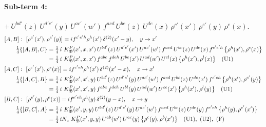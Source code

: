 \documentclass[10pt]{article}
\numberwithin{equation}{section}
\begin{document}
\paragraph{Sub-term 4:} $+\,U^{bd'}(z)\,U^{d'e'}(y)\,U^{ac'}(w')\,f^{acd}\,U^{bc}(z)\,U^{de}(x)\,\rho^{c'}(x')\,\rho^{e'}(y)\,\rho^{e}(x)$.
\begin{align}
&[A,B]:\ [\rho^{c'}(x'),\rho^{e'}(y)]=i f^{c'e'h}\rho^{h}(x')\,\delta^{(2)}(x'-y),\quad y\to x'\notag\\
&\qquad \tfrac14\{[A,B],C\}=\tfrac14\,i\,\,K^{P}_{\mathfrak B}(x',x,x')\,U^{bd'}(z)\,U^{d'e'}(x')\,U^{ac'}(w')\,f^{acd}\,U^{bc}(z)\,U^{de}(x)\,f^{c'e'h}\,\big\{\rho^{h}(x'),\rho^{e}(x)\big\}\notag\\
&\qquad\phantom{\tfrac14\{[A,B],C\}}=\tfrac14\,i\,\,K^{P}_{\mathfrak B}(x',x,x')\,f^{abc}\,f^{deh}\,U^{be}(x')\,U^{ad}(w')\,U^{cl}(x)\,\big\{\rho^{h}(x'),\rho^{l}(x)\big\}\quad\text{(U1)}
\label{B:eq:GIII.I.P-4-AB}\\
&[A,C]:\ [\rho^{c'}(x'),\rho^{e}(x)]=i f^{c'eh}\rho^{h}(x')\,\delta^{(2)}(x'-x),\quad x\to x'\notag\\
&\qquad \tfrac14\{[A,C],B\}=\tfrac14\,i\,\,K^{P}_{\mathfrak B}(x',x',y)\,U^{bd'}(z)\,U^{d'e'}(y)\,U^{ac'}(w')\,f^{acd}\,U^{bc}(z)\,U^{de}(x')\,f^{c'eh}\,\big\{\rho^{h}(x'),\rho^{e'}(y)\big\}\notag\\
&\qquad\phantom{\tfrac14\{[A,C],B\}}=\tfrac14\,i\,\,K^{P}_{\mathfrak B}(x',x',y)\,f^{abc}\,f^{deh}\,U^{bl}(y)\,U^{ad}(w')\,U^{ce}(x')\,\big\{\rho^{h}(x'),\rho^{l}(y)\big\}\quad\text{(U1)}
\label{B:eq:GIII.I.P-4-AC}\\
&[B,C]:\ [\rho^{e'}(y),\rho^{e}(x)]=i f^{e'eh}\rho^{h}(y)\,\delta^{(2)}(y-x),\quad x\to y\notag\\
&\qquad \tfrac14\{[B,C],A\}=\tfrac14\,i\,\,K^{P}_{\mathfrak B}(x',y,y)\,U^{bd'}(z)\,U^{d'e'}(y)\,U^{ac'}(w')\,f^{acd}\,U^{bc}(z)\,U^{de}(y)\,f^{e'eh}\,\big\{\rho^{h}(y),\rho^{c'}(x')\big\}\notag\\
&\qquad\phantom{\tfrac14\{[B,C],A\}}=\tfrac14\,i N_{c}\,\,K^{P}_{\mathfrak B}(x',y,y)\,U^{ab}(w')\,U^{ac}(y)\,\big\{\rho^{c}(y),\rho^{b}(x')\big\}\quad\text{(U1)},\ \text{(U2)},\ \text{(F)}
\label{B:eq:GIII.I.P-4-BC}
\end{align}
\end{document}

